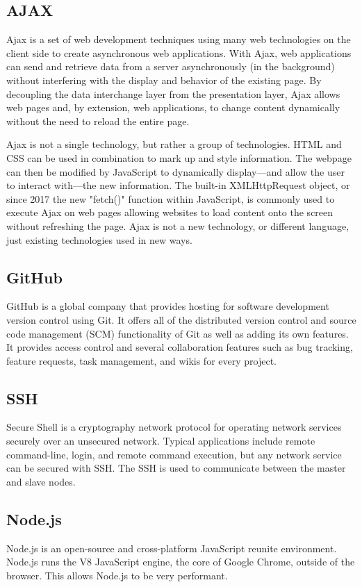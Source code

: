 \documentclass[12pt]{article}
\begin{document}
\subsection{AJAX}
Ajax is a set of web development techniques using many web technologies on the client side to create asynchronous web applications. With Ajax, web applications can send and retrieve data from a server asynchronously (in the background) without interfering with the display and behavior of the existing page. By decoupling the data interchange layer from the presentation layer, Ajax allows web pages and, by extension, web applications, to change content dynamically without the need to reload the entire page.\cite{ajax}

Ajax is not a single technology, but rather a group of technologies. HTML and CSS can be used in combination to mark up and style information. The webpage can then be modified by JavaScript to dynamically display—and allow the user to interact with—the new information. The built-in XMLHttpRequest object, or since 2017 the new "fetch()" function within JavaScript, is commonly used to execute Ajax on web pages allowing websites to load content onto the screen without refreshing the page. Ajax is not a new technology, or different language, just existing technologies used in new ways.

\subsection{GitHub}
GitHub is a global company that provides hosting for software development version control using Git. It offers all of the distributed version control and source code management (SCM) functionality of Git as well as adding its own features. It provides access control and several collaboration features such as bug tracking, feature requests, task management, and wikis for every project.\cite{git}

\subsection{SSH}
Secure Shell is a cryptography network protocol for operating network services securely over an unsecured network. Typical applications include remote command-line, login, and remote command execution, but any network service can be secured with SSH. The SSH is used to communicate between the master and slave nodes.\cite{ssh}

\subsection{Node.js}
Node.js is an open-source and cross-platform JavaScript reunite environment. Node.js runs the V8 JavaScript engine, the core of Google Chrome, outside of the browser. This allows Node.js to be very performant.
\end{document}
